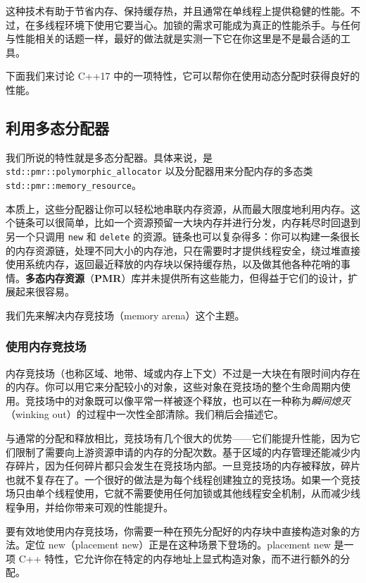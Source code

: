 这种技术有助于节省内存、保持缓存热，并且通常在单线程上提供稳健的性能。不过，在多线程环境下使用它要当心。加锁的需求可能成为真正的性能杀手。与任何与性能相关的话题一样，最好的做法就是实测一下它在你这里是不是最合适的工具。

下面我们来讨论 C++17 中的一项特性，它可以帮你在使用动态分配时获得良好的性能。

\subsection{利用多态分配器}

\label{idx:609}
我们所说的特性就是多态分配器。具体来说，是 \texttt{std::\allowbreak{}pmr::\allowbreak{}polymorphic\_\allowbreak{}allocator} 以及分配器用来分配内存的多态类 \texttt{std::\allowbreak{}pmr::\allowbreak{}memory\_\allowbreak{}resource}。

\label{idx:610}
本质上，这些分配器让你可以轻松地串联内存资源，从而最大限度地利用内存。这个链条可以很简单，比如一个资源预留一大块内存并进行分发，内存耗尽时回退到另一个只调用 \texttt{new} 和 \texttt{delete} 的资源。链条也可以复杂得多：你可以构建一条很长的内存资源链，处理不同大小的内存池，只在需要时才提供线程安全，绕过堆直接使用系统内存，返回最近释放的内存块以保持缓存热，以及做其他各种花哨的事情。\textbf{多态内存资源}（\textbf{PMR}）库并未提供所有这些能力，但得益于它们的设计，扩展起来很容易。

我们先来解决内存竞技场（memory arena）这个主题。

\subsubsection{使用内存竞技场}

\label{idx:611}
内存竞技场（也称区域、地带、域或内存上下文）不过是一大块在有限时间内存在的内存。你可以用它来分配较小的对象，这些对象在竞技场的整个生命周期内使用。竞技场中的对象既可以像平常一样被逐个释放，也可以在一种称为\emph{瞬间熄灭}（winking out）的过程中一次性全部清除。我们稍后会描述它。

与通常的分配和释放相比，竞技场有几个很大的优势——它们能提升性能，因为它们限制了需要向上游资源申请的内存的分配次数。基于区域的内存管理还能减少内存碎片，因为任何碎片都只会发生在竞技场内部。一旦竞技场的内存被释放，碎片也就不复存在了。一个很好的做法是为每个线程创建独立的竞技场。如果一个竞技场只由单个线程使用，它就不需要使用任何加锁或其他线程安全机制，从而减少线程争用，并给你带来可观的性能提升。

要有效地使用内存竞技场，你需要一种在预先分配好的内存块中直接构造对象的方法。定位 new（placement new）正是在这种场景下登场的。placement new 是一项 C++ 特性，它允许你在特定的内存地址上显式构造对象，而不进行额外的分配。

